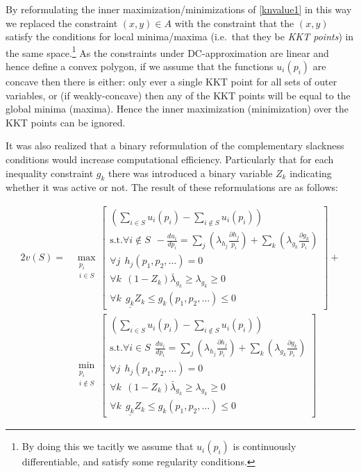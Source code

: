 By reformulating the inner maximization/minimizations of \eqref{knvalue1} in this way we replaced the constraint $(x,y)\in A$ with 
the constraint that the $(x,y)$ satisfy the conditions for local minima/maxima (i.e.\ that they be \emph{KKT points}) in 
the same space.\footnote{By doing this we tacitly we assume that $u_i(p_i)$ is continuously differentiable, and satisfy some regularity conditions.}
As the constraints under DC-approximation are linear and hence define a convex polygon,
if we assume that the functions $u_i(p_i)$ are concave then there is either: only ever a single KKT point for all sets of outer variables, or (if weakly-concave) then any of the KKT points will be equal to the global minima (maxima).
Hence the inner maximization (minimization) over the KKT points can be ignored.

It was also realized that a binary reformulation of the complementary slackness conditions would increase computational efficiency.
Particularly that for each inequality constraint $g_k$ there was introduced a binary variable $Z_k$ indicating whether it was active or not.
The result of these reformulations are as follows:

\begin{equation}
\label{optimization_eq1}
\begin{aligned}
2v(S) =& 
\max_{\substack{p_i \\ i\in S}}\left[\substack{
	\left(\sum_{i\in S}u_i(p_i) - \sum_{i\notin S}u_i(p_i)\right)\\
	\text{s.t.}\forall i\notin S~~-\frac{d u_i}{d p_i}=\sum_j(\lambda_{h_j}\frac{\partial h_j}{p_i}) + \sum_k(\lambda_{g_k}\frac{\partial g_k}{p_i})\\
	\forall j~~ h_j(p_1,p_2,\dots)=0\\
	\forall k~~ (1-Z_k)\bar{\lambda}_{g_k} \ge \lambda_{g_k} \ge 0\\
	\forall k~~ \underline{g_k}Z_k\le g_k(p_1,p_2,\dots) \le 0}
\right] +\\
&\min_{\substack{p_i \\ i\notin S}}\left[\substack{
	\left(\sum_{i\in S}u_i(p_i) - \sum_{i\notin S}u_i(p_i)\right)\\
	\text{s.t.}\forall i\in S~~\frac{d u_i}{d p_i}=\sum_j(\lambda_{h_j}\frac{\partial h_j}{p_i}) + \sum_k(\lambda_{g_k}\frac{\partial g_k}{p_i})\\
	\forall j~~ h_j(p_1,p_2,\dots)=0\\
	\forall k~~ (1-Z_k)\bar{\lambda}_{g_k} \ge \lambda_{g_k} \ge 0\\
	\forall k~~ \underline{g_k}Z_k\le g_k(p_1,p_2,\dots) \le 0}
\right]
\end{aligned}
\end{equation}

